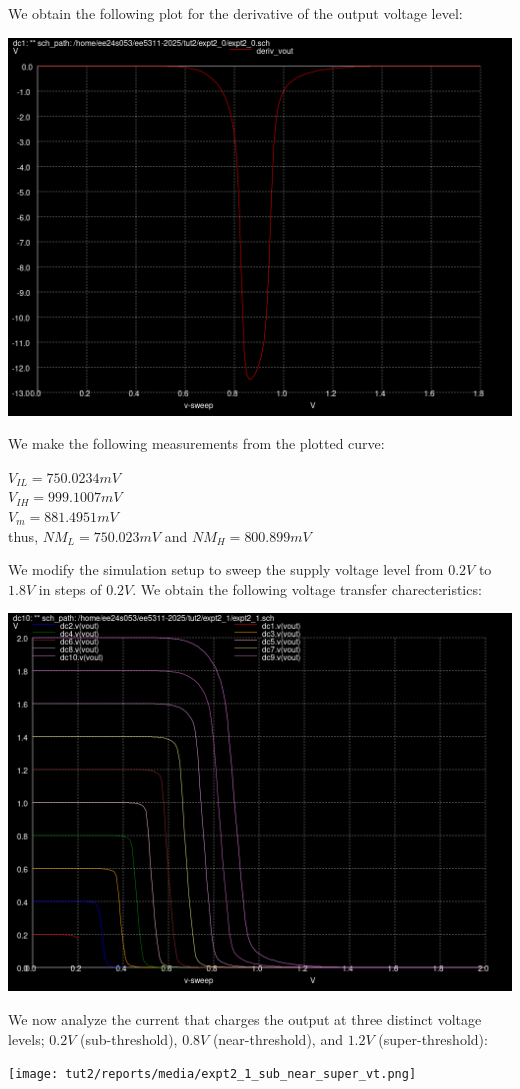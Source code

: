 \documentclass[10pt,a4paper]{article}
\begin{document}
\noindent We obtain the following plot for the derivative of the output voltage level:
\begin{center}
\includegraphics[scale=0.4]{tut2/reports/media/expt2_0_deriv_vout.png}
\end{center}

\noindent We make the following measurements from the plotted curve:

\begin{center}
    $V_{IL} = 750.0234 mV$ \\
    $V_{IH} = 999.1007 mV$ \\
    $V_m = 881.4951 mV$ \\
    thus, $NM_L = 750.023 mV$ and $NM_H = 800.899 mV$
\end{center}

\noindent We modify the simulation setup to sweep the supply voltage level from $0.2V$ to $1.8V$ in steps of $0.2V$. We obtain the following voltage transfer charecteristics:
\begin{center}
\includegraphics[scale=0.3]{tut2/reports/media/expt2_1_vtc.png}
\end{center}

\noindent We now analyze the current that charges the output at three distinct voltage levels; $0.2V$ (sub-threshold), $0.8V$ (near-threshold), and $1.2V$ (super-threshold):
\begin{center}
\texttt{[image: tut2/reports/media/expt2\_1\_sub\_near\_super\_vt.png]}
\end{center}
\end{document}
